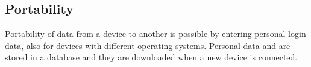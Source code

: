 \documentclass[../../../rasd.tex]{subfiles}
\begin{document}
\subsection{Portability\label{sect:3.5.5}}

Portability of  data from a device to another is possible by entering personal login data, also for devices with different operating systems. Personal data and  are stored in a database and they are downloaded when a new device is connected. 
\end{document}

